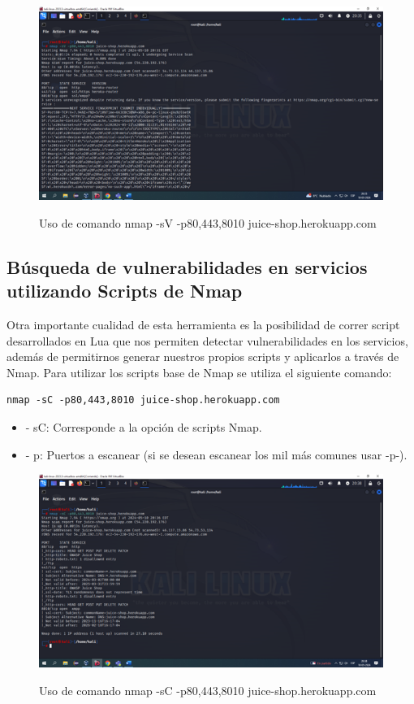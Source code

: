 \documentclass[stu, 11pt, letterpaper, donotrepeattitle, floatsintext, natbib]{apa7}
\begin{document}
\begin{figure}[H]
    \centering
    \caption{Uso de comando nmap -sV -p80,443,8010 juice-shop.herokuapp.com}
    \includegraphics[width=0.75\linewidth]{Imagen2.png} %
    \label{fig:OverallEffect}
\end{figure}

\subsection{Búsqueda de vulnerabilidades en servicios utilizando Scripts de Nmap} 
Otra importante cualidad de esta herramienta es la posibilidad de correr script desarrollados en Lua que nos permiten detectar vulnerabilidades en los servicios, además de permitirnos generar nuestros propios scripts y aplicarlos a través de Nmap. Para utilizar los scripts base de Nmap se utiliza el siguiente comando:
\newline

\begin{lstlisting}
nmap -sC -p80,443,8010 juice-shop.herokuapp.com
\end{lstlisting}

\begin{itemize}
  \item[] - sC: Corresponde a la opción de scripts Nmap.
  \item[] - p: Puertos a escanear (si se desean escanear los mil más comunes usar -p-).
\end{itemize}

\begin{figure}[H]
    \centering
    \caption{Uso de comando nmap -sC -p80,443,8010 juice-shop.herokuapp.com}
    \includegraphics[width=0.75\linewidth]{Imagen3.png} %
    \label{fig:OverallEffect}
\end{figure}
\end{document}
